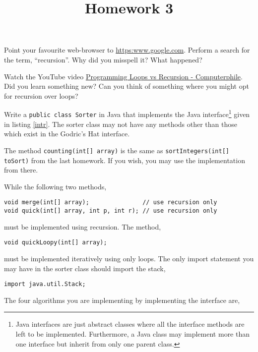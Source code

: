 \documentclass{homework}
\title{Homework 3}
\newcommand\computerphile{\href{%
    https://www.youtube.com/watch?v=HXNhEYqFo0o%
  }{Programming Loops vs Recursion - Computerphile}}
\begin{document}
 \maketitle

\question Point your favourite web-browser to \url{https:www.google.com}.
Perform a search for the term, ``recursion''. Why did you misspell
it? What happened?

\question\label{vid} Watch the YouTube video \computerphile. Did you
learn something new? Can you think of something where you might opt
for recursion over loops?

\question Write a \texttt{public class Sorter} in Java that implements the
Java interface\footnote{Java interfaces are just abstract classes
  where all the interface methods are left to be implemented.
  Furthermore, a Java class may implement more than one interface
  but inherit from only one parent class.} given in listing
\ref{intr}. The sorter class may not have any methods other than
those which exist in the Godric's Hat interface.

% 

The method \texttt{counting(int[] array)} is the same as
\texttt{sortIntegers(int[] toSort)} from the last homework. If you
wish, you may use the implementation from there.

While the following two methods,

\begin{verbatim}
void merge(int[] array);               // use recursion only
void quick(int[] array, int p, int r); // use recursion only
\end{verbatim}

must be implemented using recursion. The method,

\begin{verbatim}
void quickLoopy(int[] array);
\end{verbatim}

must be implemented iteratively \ie using only loops. The only
import statement you may have in the sorter class should import
the stack,

\begin{verbatim}
import java.util.Stack;
\end{verbatim}

The four algorithms you are implementing by implementing the
interface are,
\end{document}
